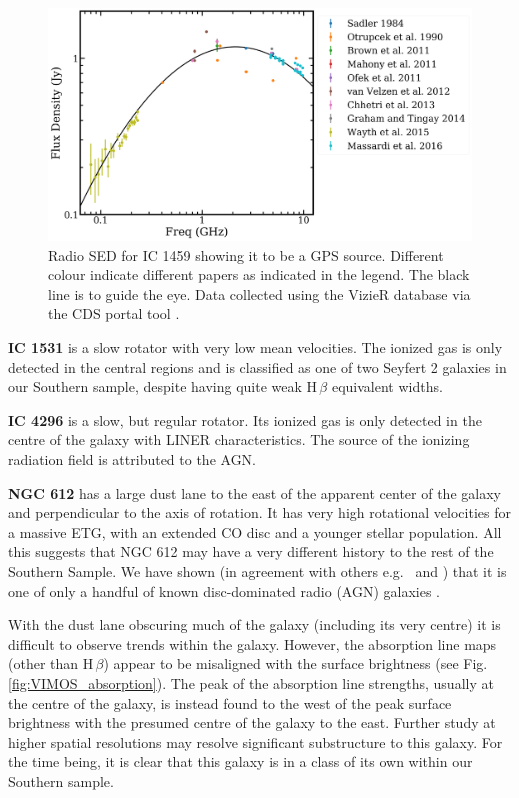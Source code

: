 \begin{figure}
	\centering
	\includegraphics[height=0.4\textwidth]{appendix/appendix2/ic1459.png}
	\caption[Radio SED for IC 1459]{Radio SED for IC 1459 showing it to be a GPS source. Different colour indicate different papers as indicated in the legend. The black line is to guide the eye. Data collected using the VizieR database via the CDS portal tool \citep{Ochsenbein2000}.} 
	\label{fig:ic1459radio}
\end{figure}
\nocite{Brown2011, Massardi2016, Ofek2011, Wayth2015, Mahony2011, Otrupcek1990, Graham2014, Chhetri2013, VanVelzen2012, Sadler1984}

\textbf{IC 1531} is a slow rotator with very low mean velocities. The ionized gas is only detected in the central regions and is classified as one of two Seyfert 2 galaxies in our Southern sample, despite having quite weak H\,$\beta$ equivalent widths. 

\textbf{IC 4296} is a slow, but regular rotator. Its ionized gas is only detected in the centre of the galaxy with LINER characteristics. The source of the ionizing radiation field is attributed to the AGN. 

\textbf{NGC 612} has a large dust lane to the east of the apparent center of the galaxy and perpendicular to the axis of rotation. It has very high rotational velocities for a massive ETG, with an extended CO disc and a younger stellar population. All this suggests that NGC 612 may have a very different history to the rest of the Southern Sample. We have shown (in agreement with others e.g.\ \citealt{Ledlow1998} and \citealt{Emonts2009}) that it is one of only a handful of known disc-dominated radio (AGN) galaxies \citep[e.g.][]{Morganti2011}. %

With the dust lane obscuring much of the galaxy (including its very centre) it is difficult to observe trends within the galaxy. However, the absorption line maps (other than H\,$\beta$) appear to be misaligned with the surface brightness (see Fig.\,\ref{fig:VIMOS_absorption}). The peak of the absorption line strengths, usually at the centre of the galaxy, is instead found to the west of the peak surface brightness with the presumed centre of the galaxy to the east. Further study at higher spatial resolutions may resolve significant substructure to this galaxy. For the time being, it is clear that this galaxy is in a class of its own within our Southern sample. 

